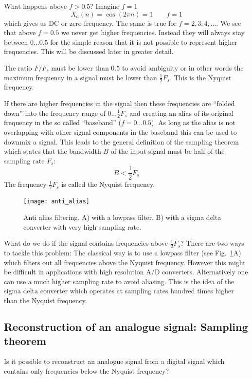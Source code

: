 \documentclass[12pt,a4paper]{article}
\begin{document}
What happens above $f>0.5$? Imagine $f = 1$
\begin{equation}
X_{a}(n) = \cos (2 \pi n) = 1 \qquad f=1
\end{equation}
which gives us DC or zero frequency. The same is true for
$f = 2, 3, 4, \ldots$. We see that above $f=0.5$ we never
get higher frequencies. Instead they will always stay between
$0\ldots 0.5$ for the simple reason that it is not possible
to represent higher frequencies. This will be discussed later
in greater detail.

The ratio $F/F_s$ must  be lower than $0.5$ to avoid ambiguity
or in other words the maximum frequency in a signal must be lower than 
$\frac{1}{2} F_s$. This is the Nyquist frequency.

If there are higher frequencies in the signal then these frequencies
are ``folded down'' into the frequency range of $0\ldots \frac{1}{2} F_s$
and creating an alias of its original frequency in the so called
``baseband'' ($f=0\ldots 0.5$). As long as the alias is not overlapping
with other signal components in the baseband this can be used to
downmix a signal. This leads to the general definition of the
sampling theorem which states that the bandwidth $B$ of the input signal
must be half of the sampling rate $F_s$:
\begin{equation}
B < \frac{1}{2}F_s
\label{samplingTheorem}
\end{equation}
The frequency $\frac{1}{2}F_s$ is called the Nyquist frequency.

\begin{figure}[!hbt]
\begin{center}
\mbox{\texttt{[image: anti\_alias]}}
\end{center}
\caption{Anti alias filtering. A) with a lowpass filter. B)
with a sigma delta converter with very high sampling rate.
\label{anti_alias}}
\end{figure}

What do we do if the signal contains frequencies above 
$\frac{1}{2} F_s$? There are two ways to tackle this problem:
The classical way is
to use a lowpass filter (see Fig.~\ref{anti_alias}A) which filters
out all frequencies above the Nyquist frequency. However this
might be difficult in applications with high resolution A/D converters.
Alternatively one can use a much higher sampling rate to avoid
aliasing. This is the idea of the sigma delta converter
which operates at sampling rates hundred times higher than the
Nyquist frequency.


\subsection{Reconstruction of an analogue signal: Sampling theorem}
Is it possible to reconstruct an analogue signal from a digital signal
which contains only frequencies below the Nyquist frequency?
\end{document}
